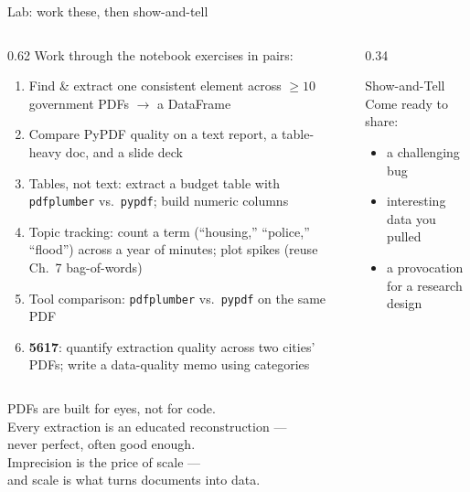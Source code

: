 \documentclass[9pt,aspectratio=169]{beamer}
\begin{document}
\begin{frame}{Lab: work these, then show-and-tell}
    \begin{columns}[T]
        \begin{column}{0.62\textwidth}
            Work through the notebook exercises in pairs:
            \begin{enumerate}\small
                \item Find \& extract one consistent element across $\geq 10$ government PDFs $\rightarrow$ a DataFrame
                \item Compare PyPDF quality on a text report, a table-heavy doc, and a slide deck
                \item Tables, not text: extract a budget table with \texttt{pdfplumber} vs.\ \texttt{pypdf}; build numeric columns
                \item Topic tracking: count a term (``housing,'' ``police,'' ``flood'') across a year of minutes; plot spikes (reuse Ch.~7 bag-of-words)
                \item Tool comparison: \texttt{pdfplumber} vs.\ \texttt{pypdf} on the same PDF
                \item[6.] \textcolor{tab-purple}{\textbf{5617}}: quantify extraction quality across two cities' PDFs; write a data-quality memo using \textcite{gebru2021datasheets} categories
            \end{enumerate}
        \end{column}
        \begin{column}{0.34\textwidth}
            \begin{block}{Show-and-Tell}
                \footnotesize Come ready to share:
                \begin{itemize}\footnotesize
                    \item a challenging bug
                    \item interesting data you pulled
                    \item a provocation for a research design
                \end{itemize}
            \end{block}
        \end{column}
    \end{columns}
\end{frame}

\begin{frame}[standout]
    PDFs are built for eyes, not for code.\\
    Every extraction is an educated reconstruction ---\\
    never perfect, often good enough.\\[1em]
    {\large Imprecision is the price of scale ---\\ and scale is what turns documents into data.}
\end{frame}
\end{document}
